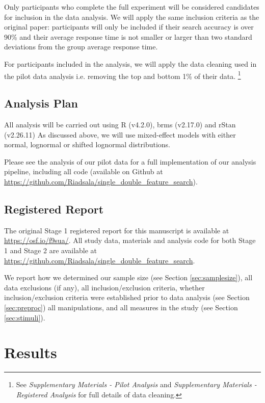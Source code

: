 \documentclass[preprint,12pt,authoryear]{elsarticle}
\begin{document}
Only participants who complete the full experiment will be considered candidates for inclusion in the data analysis. We will apply the same inclusion criteria as the original paper: participants will only be included if their search accuracy is over 90\% and their average response time is not smaller or larger than two standard deviations from the group average response time. 

For participants included in the analysis, we will apply the data cleaning used in the pilot data analysis i.e. removing the top and bottom 1\% of their data. \footnote{See \textit{Supplementary Materials - Pilot Analysis} and \textit{Supplementary Materials - Registered Analysis} for full details of data cleaning.}

\subsection{Analysis Plan}

All analysis will be carried out using R (v4.2.0), brms (v2.17.0) and rStan (v2.26.11) As discussed above, we will use mixed-effect models with either normal, lognormal or shifted lognormal distributions. 

Please see the analysis of our pilot data for a full implementation of our analysis pipeline, including all code (available on Github at  
\url{https://github.com/Riadsala/single_double_feature_search}).

\subsection{Registered Report}

The original Stage 1 registered report for this manuscript is available at \url{https://osf.io/f9sua/}. All study data, materials and analysis code for both Stage 1 and Stage 2 are available at \url{https://github.com/Riadsala/single_double_feature_search}.

We report how we determined our sample size (see Section \ref{sec:samplesize}), all data exclusions (if any), all inclusion/exclusion criteria, whether inclusion/exclusion criteria were established prior to data analysis (see Section \ref{sec:preproc}) all manipulations, and all measures in the study (see Section \ref{sec:stimuli}). 

\section{Results}
\end{document}

